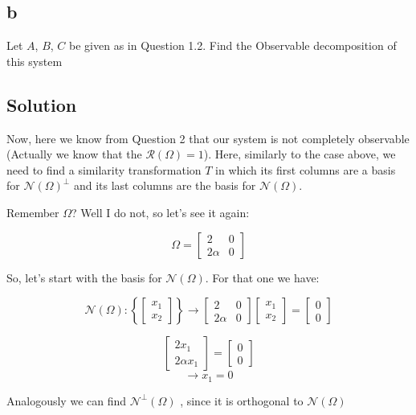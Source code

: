 \documentclass[10pt,a4paper]{article}
\begin{document}
\subsection*{b}
Let $A$, $B$, $C$ be given as in Question 1.2. Find the Observable decomposition of this system

\subsection*{Solution}
Now, here we know from Question 2 that our system is not completely observable (Actually we know that the $\mathcal{R}(\Omega) = 1$). Here, similarly to the case above, we need to find  a similarity transformation $T$ in which its first columns are a basis for $\mathcal{N}(\Omega)^{\perp}$ and its last columns are the basis for $\mathcal{N}(\Omega)$.

Remember $\Omega$? Well I do not, so let's see it again:

\[
\Omega =
\begin{bmatrix}
2 & 0 \\
2\alpha & 0
\end{bmatrix}
\]

So, let's start with the basis for $\mathcal{N}(\Omega)$. For that one we have:

\[
\mathcal{N}(\Omega) : 
\left \{ 
\begin{bmatrix}
x_{1} \\
x_{2}
\end{bmatrix}
\right \}
\rightarrow
\begin{bmatrix}
2 & 0 \\
2\alpha & 0
\end{bmatrix}
\begin{bmatrix}
x_{1} \\
x_{2}
\end{bmatrix}
=
\begin{bmatrix}
0 \\
0
\end{bmatrix}
\]

\[
\begin{bmatrix}
2x_{1} \\
2\alpha x_{1}
\end{bmatrix}
=
\begin{bmatrix}
0 \\
0
\end{bmatrix}
\]
\[
\rightarrow
x_{1} = 0 
\]

\begin{center}
\end{center}
Analogously we can find $\mathcal{N^{\perp}}(\Omega)$ , since it is orthogonal to $\mathcal{N}(\Omega)$
\end{document}
